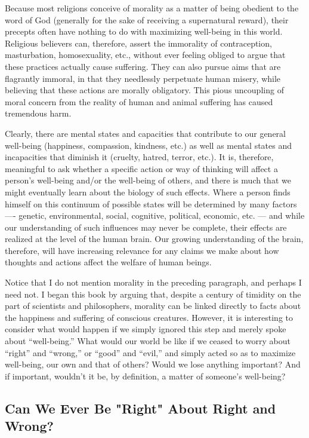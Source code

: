 \documentclass[a4paper,14pt]{extbook}
\begin{document}
Because most religions conceive of morality as a matter of being obedient to the word of God (generally for the sake of receiving a supernatural reward), their precepts often have nothing to do with maximizing well-being in this world.
Religious believers can, therefore, assert the immorality of contraception, masturbation, homosexuality, etc., without ever feeling obliged to argue that these practices actually cause suffering.
They can also pursue aims that are flagrantly immoral, in that they needlessly perpetuate human misery, while believing that these actions are morally obligatory.
This pious uncoupling of moral concern from the reality of human and animal suffering has caused tremendous harm.

Clearly, there are mental states and capacities that contribute to our general well-being (happiness, compassion, kindness, etc.) as well as mental states and incapacities that diminish it (cruelty, hatred, terror, etc.).
It is, therefore, meaningful to ask whether a specific action or way of thinking will affect a person's well-being and/or the well-being of others, and there is much that we might eventually learn about the biology of such effects.
Where a person finds himself on this continuum of possible states will be determined by many factors ---- genetic, environmental, social, cognitive, political, economic, etc. --- and while our understanding of such influences may never be complete, their effects are realized at the level of the human brain.
Our growing understanding of the brain, therefore, will have increasing relevance for any claims we make about how thoughts and actions affect the welfare of human beings.

Notice that I do not mention morality in the preceding paragraph, and perhaps I need not.
I began this book by arguing that, despite a century of timidity on the part of scientists and philosophers, morality can be linked directly to facts about the happiness and suffering of conscious creatures.
However, it is interesting to consider what would happen if we simply ignored this step and merely spoke about ``well-being.''
What would our world be like if we ceased to worry about ``right'' and ``wrong,'' or ``good'' and ``evil,'' and simply acted so as to maximize well-being, our own and that of others?
Would we lose anything important?
And if important, wouldn't it be, by definition, a matter of someone's well-being?

\subsection{Can We Ever Be "Right" About Right and Wrong?}
\end{document}

